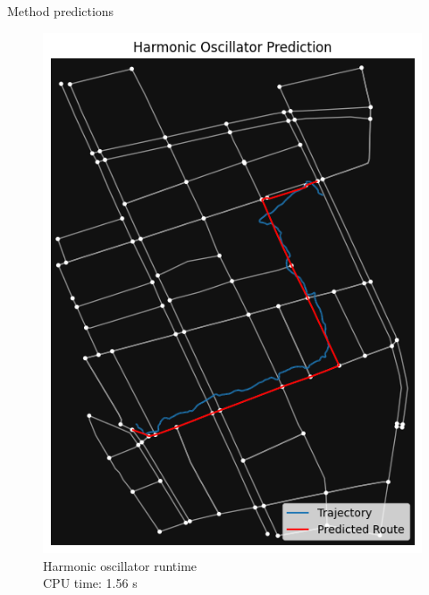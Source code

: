 \documentclass[aspectratio=169, bigfiles, professionalfonts, hyperref={colorlinks=true, allcolors=., urlcolor=blue}]{beamer}
\begin{document}
\begin{frame}{Method predictions}
\begin{figure}[ht]
\begin{minipage}{0.24\linewidth}
\includegraphics[width=\textwidth]{Jupyter Notebook LaTeX/leastsquaressendai.png}
\\\scriptsize{Harmonic oscillator runtime\\
CPU time: 1.56 s}
\end{minipage}
\begin{minipage}{0.24\linewidth}
\centering

\end{minipage}
\end{figure}
\end{frame}
\end{document}
